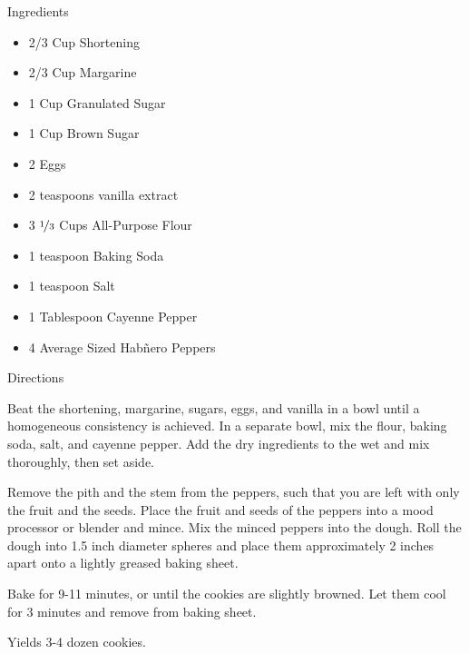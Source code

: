 Ingredients
\begin{itemize}
	\item 2/3 Cup Shortening
	\item 2/3 Cup Margarine
	\item 1 Cup Granulated Sugar
	\item 1 Cup Brown Sugar
	\item 2 Eggs
	\item 2 teaspoons vanilla extract
	\item 3 $\nicefrac{1}{3}$  Cups All-Purpose Flour
	\item 1 teaspoon Baking Soda
	\item 1 teaspoon Salt
	\item 1 Tablespoon Cayenne Pepper
	\item 4 Average Sized Hab{\~{n}}ero Peppers
\end{itemize}

\noindent
Directions
\newline

Beat the shortening, margarine, sugars, eggs, and vanilla in a bowl until a homogeneous consistency is achieved. In a separate bowl, mix the flour, baking soda, salt, and cayenne pepper. Add the dry ingredients to the wet and mix thoroughly, then set aside.

Remove the pith and the stem from the peppers, such that you are left with only the fruit and the seeds. Place the fruit and seeds of the peppers into a mood processor or blender and mince. Mix the minced peppers into the dough. Roll the dough into 1.5 inch diameter spheres and place them approximately 2 inches apart onto a lightly greased baking sheet.

Bake for 9-11 minutes, or until the cookies are slightly browned. Let them cool for 3 minutes and remove from baking sheet.

Yields 3-4 dozen cookies.